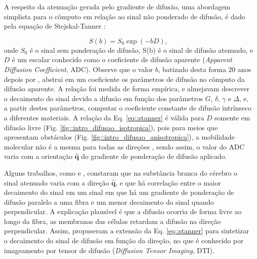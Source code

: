 \documentclass[
    12pt,                %
    oneside,            %
    a4paper,            %
    english,            %
    french,                %
    spanish,            %
    brazil                %
    ]{abntex2}
\begin{document}

A respeito da atenuação gerada pelo gradiente de difusão, uma abordagem simplista \cite{descoteaux2015} para o cômputo em relação ao sinal não ponderado de difusão, é dado pela equação de Stejskal-Tanner \cite{stejskal1965}:

\begin{equation}
\label{eq::stanner}
    S(b) = S_0\exp{(-bD)} ,
\end{equation}
onde $S_0$ é o sinal sem ponderação de difusão, S(b) é o sinal de difusão atenuado, e $D$ é um escalar conhecido como o coeficiente de difusão aparente (\textit{Apparent Diffusion Coefficient}, ADC). Observe que o valor $b$, batizado desta forma 20 anos depois por , abstrai em um coeficiente os parâmetros de difusão no cômputo da difusão aparente. A relação foi medida de forma empírica, e  almejavam descrever o decaimento do sinal devido a difusão em função dos parâmetros $G$, $\delta$, $\gamma$ e $\Delta$, e, a partir destes parâmetros, computar o coeficiente constante de difusão intrínseco a diferentes materiais.
A relação da Eq. \ref{eq::stanner} é válida para $D$ somente em difusão livre (Fig. \ref{fig::intro_difusao_isotropica}), pois para meios que apresentam obstáculos (Fig. \ref{fig::intro_difusao_anisotropica}), a mobilidade molecular não é a mesma para todas as direções \cite{douek1991}, sendo assim, o valor do ADC varia com a orientação $\mathbf{\hat{q}}$ do gradiente de ponderação de difusão aplicado.

Alguns trabalhos, como  e , constaram que na substância branca do cérebro o sinal atenuado varia com a direção $\mathbf{\hat{q}}$, e que há correlação entre o maior decaimento do sinal em um sinal em que há um gradiente de ponderação de difusão paralelo a uma fibra e um menor decaimento do sinal quando perpendicular. A explicação plausível \cite{Basser1994} é que a difusão ocorria de forma livre ao longo da fibra, as membranas das células retardam a difusão na direção perpendicular. Assim,  propuseram a extensão da Eq. \ref{eq::stanner} para sintetizar o decaimento do sinal de difusão em função da direção, no que é conhecido por imageamento por tensor de difusão (\textit{Diffusion Tensor Imaging}, DTI).


\end{document}
